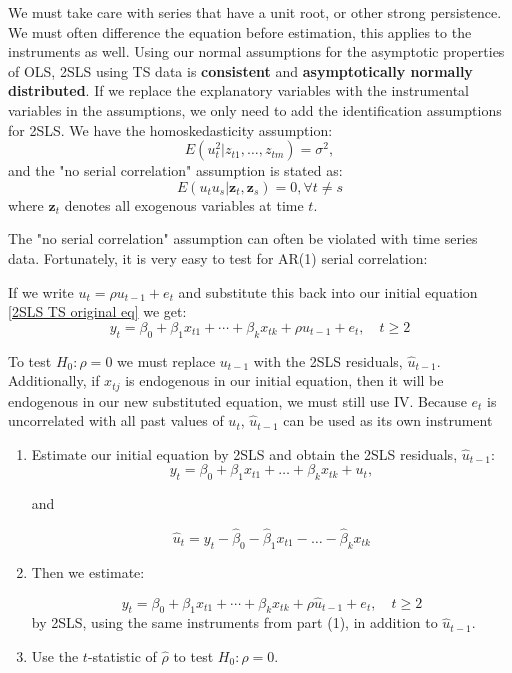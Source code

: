 \documentclass[11pt]{article}
\begin{document}
We must take care with series that have a unit root, or other strong persistence. We must often difference the equation before estimation, this applies to the instruments as well. Using our normal assumptions for the asymptotic properties of OLS, 2SLS using TS data is \textbf{consistent} and \textbf{asymptotically normally distributed}. If we replace the explanatory variables with the instrumental variables in the assumptions, we only need to add the identification assumptions for 2SLS. We have the homoskedasticity assumption:
\begin{equation}
    \label{TS 2SLS homoskedasticity}
    E(u_t^2|z_{t1},\ldots, z_{tm}) = \sigma^2,
\end{equation}
and the "no serial correlation" assumption is stated as:
\begin{equation}
    \label{TS 2SLS no serial correlation}
    E(u_t u_s|\boldsymbol{z}_t,\boldsymbol{z}_s)=0, \forall t\neq s
\end{equation}
where $\boldsymbol{z}_t$ denotes all exogenous variables at time $t$.

The "no serial correlation" assumption can often be violated with time series data. Fortunately, it is very easy to test for AR(1) serial correlation:
\begin{procedure}
    If we write $u_t = \rho u_{t-1} + e_t$ and substitute this back into our initial equation \eqref{2SLS TS original eq} we get:
    \begin{equation}
y_t=\beta_0+\beta_1 x_{t 1}+\cdots+\beta_k x_{t k}+\rho u_{t-1}+e_{t}, \quad t \geq 2
\end{equation}

To test $H_0: \rho=0$ we must replace $u_{t-1}$ with the 2SLS residuals, $\hat{u}_{t-1}$. Additionally, if $x_{tj}$ is endogenous in our initial equation, then it will be endogenous in our new substituted equation, we must still use IV. Because $e_t$ is uncorrelated with all past values of $u_t$, $\hat{u}_{t-1}$ can be used as its own instrument

\begin{enumerate}
    \item Estimate our initial equation by 2SLS and obtain the 2SLS residuals, $\hat{u}_{t-1}$:
    \[y_t = \beta_0 + \beta_1 x_{t1} + \ldots + \beta_k x_{tk} + u_t, \]

    and 
    
    \[\hat{u}_{t} = y_t - \hat{\beta}_0 - \hat{\beta}_1 x_{t1} - \ldots - \hat{\beta}_k x_{tk}\]

    \item Then we estimate:
    
    \[y_t=\beta_0+\beta_1 x_{t 1}+\cdots+\beta_k x_{t k}+\rho \hat{u}_{t-1}+e_{t}, \quad t \geq 2\]
    by 2SLS, using the same instruments from part (1), in addition to $\hat{u}_{t-1}$.

    \item Use the $t$-statistic of $\hat{\rho}$ to test $H_0: \rho = 0$.
\end{enumerate}
\end{procedure}
\end{document}
